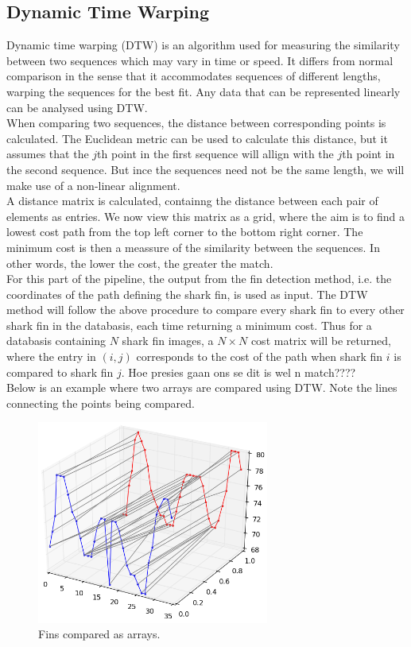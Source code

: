 \documentclass[a4paper,10pt]{article}
\begin{document}
\subsection{Dynamic Time Warping}
Dynamic time warping (DTW) is an algorithm used for measuring the similarity
between two sequences which may vary in time or speed.
It differs from normal comparison in the sense that it accommodates sequences of
different lengths, warping the sequences for the best fit.
Any data that can be represented linearly can be analysed using DTW.  \\

When comparing two sequences, the distance between corresponding points is
calculated.  The Euclidean metric can be used to calculate this distance,
but it assumes that the $j$th point in the first sequence will allign with the
$j$th point in the second sequence.  But ince the sequences need not be
the same length, we will make use of a non-linear alignment. \\

A distance matrix is calculated, containng the distance between each pair of
elements as entries.  We now view this matrix as a grid, where the aim is to 
find a lowest cost path from the top left corner to the bottom right corner. 
The minimum cost is then a meassure of the similarity between the sequences.
In other words, the lower the cost, the greater the match.
\\

For this part of the pipeline, the output from the fin detection method, i.e.
the coordinates of the path defining the shark fin, is used as input.
The DTW method will follow the above procedure to compare every shark fin to
every other shark fin in the databasis, each time returning a minimum cost.  
Thus for a databasis containing $N$ shark fin images, a $N \times N$ cost matrix
will be returned, where the entry in $(i, j)$ corresponds to the cost of the
path
when shark fin $i$ is compared to shark fin $j$. Hoe presies gaan ons se dit is
wel n match???? \\


Below is an example where two arrays are compared using DTW. Note the lines
connecting the points being compared.
\begin{figure}[H]
 \centering
 \includegraphics[width=3in]{dtw.jpg}
 \caption{Fins compared as arrays.}
 \label{dtw}
\end{figure}
\end{document}
